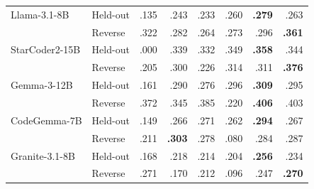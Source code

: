 \begin{table}[!t]
\begin{tabular}{@{}llrrrrrr@{}}
\addlinespace[2pt]

Llama-3.1-8B
& Held-out
& .135
& \textcolor{green!55!black}{.243}
& \textcolor{green!55!black}{.233}
& \textcolor{green!55!black}{.260}
& \textbf{\textcolor{green!55!black}{.279}}
& \textcolor{green!55!black}{.263} \\
& Reverse
& .322
& \textcolor{red!70!black}{.282}
& \textcolor{red!70!black}{.264}
& \textcolor{red!70!black}{.273}
& \textcolor{red!70!black}{.296}
& \textbf{\textcolor{green!55!black}{.361}} \\

\addlinespace[2pt]

StarCoder2-15B
& Held-out
& .000
& \textcolor{green!55!black}{.339}
& \textcolor{green!55!black}{.332}
& \textcolor{green!55!black}{.349}
& \textbf{\textcolor{green!55!black}{.358}}
& \textcolor{green!55!black}{.344} \\
& Reverse
& .205
& \textcolor{green!55!black}{.300}
& \textcolor{green!55!black}{.226}
& \textcolor{green!55!black}{.314}
& \textcolor{green!55!black}{.311}
& \textbf{\textcolor{green!55!black}{.376}} \\

\addlinespace[2pt]

Gemma-3-12B
& Held-out
& .161
& \textcolor{green!55!black}{.290}
& \textcolor{green!55!black}{.276}
& \textcolor{green!55!black}{.296}
& \textbf{\textcolor{green!55!black}{.309}}
& \textcolor{green!55!black}{.295} \\
& Reverse
& .372
& \textcolor{red!70!black}{.345}
& \textcolor{green!55!black}{.385}
& \textcolor{red!70!black}{.220}
& \textbf{\textcolor{green!55!black}{.406}}
& \textcolor{green!55!black}{.403} \\

\addlinespace[2pt]

CodeGemma-7B
& Held-out
& .149
& \textcolor{green!55!black}{.266}
& \textcolor{green!55!black}{.271}
& \textcolor{green!55!black}{.262}
& \textbf{\textcolor{green!55!black}{.294}}
& \textcolor{green!55!black}{.267} \\
& Reverse
& .211
& \textbf{\textcolor{green!55!black}{.303}}
& \textcolor{green!55!black}{.278}
& \textcolor{red!70!black}{.080}
& \textcolor{green!55!black}{.284}
& \textcolor{green!55!black}{.287} \\

\addlinespace[2pt]

Granite-3.1-8B
& Held-out
& .168
& \textcolor{green!55!black}{.218}
& \textcolor{green!55!black}{.214}
& \textcolor{green!55!black}{.204}
& \textbf{\textcolor{green!55!black}{.256}}
& \textcolor{green!55!black}{.234} \\
& Reverse
& .271
& \textcolor{red!70!black}{.170}
& \textcolor{red!70!black}{.212}
& \textcolor{red!70!black}{.096}
& \textcolor{red!70!black}{.247}
& \textbf{\textcolor{red!70!black}{.270}} \\

\bottomrule
\end{tabular}
\end{table}

